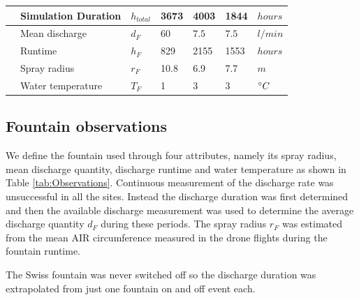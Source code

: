 \documentclass[utf8]{frontiersSCNS}
\begin{document}
\begin{table}
\begin{tabular}{@{}|lllllll|@{}}
		\multicolumn{1}{|l|}{} & Simulation Duration        & $h_{total} $    & 3673          & 4003
		                       & 1844                        & $hours$                                                                     \\\bottomrule
		\multicolumn{1}{|l|}{\multirow{4}{*}{\rotatebox[origin=c]{90}{Fountain}}}
		                       & Mean discharge              & $d_F     $      & $60$          & $7.5$        &
		$7.5$                  & $l/min$                                                                                                   \\
		\multicolumn{1}{|l|}{} & Runtime                     & $h_F $          & 829           & 2155
		                       & 1553                        & $hours$                                                                     \\
		\multicolumn{1}{|l|}{} & Spray radius                & $r_{F}$         & 10.8          & 6.9
		                       & 7.7                         & $m$                                                                         \\
		\multicolumn{1}{|l|}{} & Water temperature           & $T_{F}$         & 1             & 3
		                       & 3                           & $\degree C$                                                                 \\\midrule
	\end{tabular}
\end{table}


\subsection{Fountain observations}

We define the fountain used through four attributes, namely its spray radius, mean discharge quantity, discharge
runtime and water temperature as shown in Table \ref{tab:Observations}. Continuous measurement of the discharge
rate was unsuccessful in all the sites. Instead the discharge duration was first determined and then the
available discharge measurement was used to determine the average discharge quantity $d_F$ during these periods.
The spray radius $r_F$ was estimated from the mean AIR circumference measured in the drone flights during the
fountain runtime.

The Swiss fountain was never switched off so the discharge duration was extrapolated from just one fountain on
and off event each.
\end{document}
